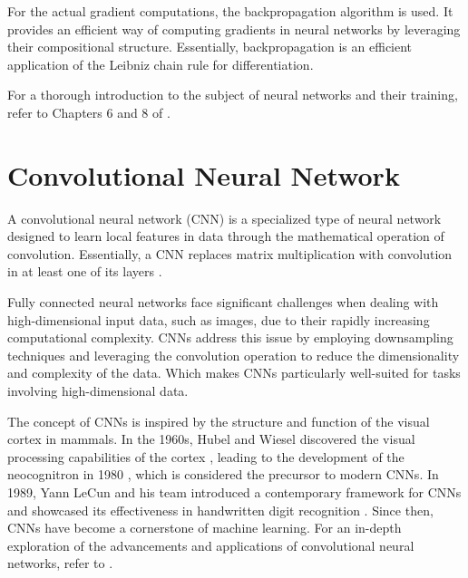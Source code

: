 \documentclass[../../thesis.tex]{subfiles}
\begin{document}
For the actual gradient computations, the backpropagation algorithm is used. It provides an efficient way of computing gradients in neural networks by leveraging their compositional structure. Essentially, backpropagation is an efficient application of the Leibniz chain rule for differentiation.\newline

For a thorough introduction to the subject of neural networks and their training, refer to Chapters 6 and 8 of \cite{deeplearningbook}.


\section{Convolutional Neural Network}

A convolutional neural network (CNN) is a specialized type of neural network designed to learn local features in data through the mathematical operation of convolution. Essentially, a CNN replaces matrix multiplication with convolution in at least one of its layers \cite{deeplearningbook}. \newline

Fully connected neural networks face significant challenges when dealing with high-dimensional input data, such as images, due to their rapidly increasing computational complexity. CNNs address this issue by employing downsampling techniques and leveraging the convolution operation to reduce the dimensionality and complexity of the data. Which makes CNNs particularly well-suited for tasks involving high-dimensional data.\newline

The concept of CNNs is inspired by the structure and function of the visual cortex in mammals. In the 1960s, Hubel and Wiesel discovered the visual processing capabilities of the cortex \cite{https://doi.org/10.1113/jphysiol.1968.sp008455}, leading to the development of the neocognitron in 1980 \cite{6313076}, which is considered the precursor to modern CNNs. In 1989, Yann LeCun and his team introduced a contemporary framework for CNNs and showcased its effectiveness in handwritten digit recognition \cite{LeCun1989ConvNet}. Since then, CNNs have become a cornerstone of machine learning. For an in-depth exploration of the advancements and applications of convolutional neural networks, refer to \cite{gu2017recent}.
\end{document}
